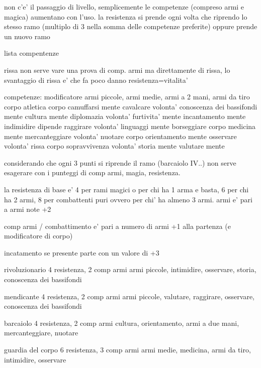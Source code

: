 \documentclass[12pt,a4paper,twoside,openany]{book}
\begin{document}
non c'e' il passaggio di livello, semplicemente le competenze (compreso armi e magica) aumentano con l'uso. la resistenza si prende ogni volta che riprendo lo stesso ramo (multiplo di 3 nella somma delle competenze preferite) oppure prende un nuovo ramo

lista compentenze

rissa non serve vare una prova di comp. armi ma direttamente di rissa, lo svantaggio di rissa e' che fa poco danno
resistenza=vitalita'



competenze:													modificatore
armi piccole, armi medie, armi a 2 mani, armi da tiro		corpo
atletica													corpo
camuffarsi													mente
cavalcare													volonta'	
conoscenza dei bassifondi									mente
cultura														mente			
diplomazia													volonta'		
furtivita'													mente	
incantamento												mente
indimidire 													dipende		
raggirare													volonta'
linguaggi													mente
borseggiare												corpo				
medicina													mente	
mercanteggiare 												volonta'		
nuotare 													corpo
orientamento												mente		
osservare													volonta'
rissa 														corpo		
sopravvivenza												volonta'
storia														mente	
valutare													mente			




considerando che ogni 3 punti si riprende il ramo (barcaiolo IV..) non serve esagerare con i punteggi di comp armi, magia, resistenza.

la resistenza di base e' 4 per rami magici o per chi ha 1 arma e basta, 6 per chi ha 2 armi, 8 per combattenti puri ovvero per chi' ha almeno 3 armi. 
armi e' pari a armi note +2

comp armi / combattimento e' pari a numero di armi +1 alla partenza (e modificatore di corpo)

incatamento se presente parte con un valore di +3

rivoluzionario  4 resistenza, 2 comp armi
armi piccole, intimidire, osservare, storia, conoscenza dei bassifondi

mendicante 4 resistenza, 2 comp armi
armi piccole, valutare, raggirare, osservare, conoscenza dei bassifondi

barcaiolo 4 resistenza, 2 comp armi
cultura, orientamento, armi a due mani,  mercanteggiare, nuotare

guardia del corpo 6 resistenza, 3 comp armi
armi medie, medicina, armi da tiro, intimidire, osservare
\end{document}
